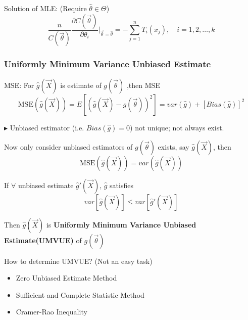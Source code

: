 \documentclass[11pt,a4paper]{ctexart}
\numberwithin{equation}{section}%
\newenvironment{point}{\raggedright$\blacktriangleright$}{}%
\begin{document}
        Solution of MLE: (Require $\hat{\theta}\in\Theta$)
        \[
            \frac{n}{C(\vec{\theta})}\frac{\partial C(\vec{\theta})}{\partial \theta_i}\bigg|_{\vec{\theta}=\hat{\theta}}=-\sum_{j=1}^nT_i(x_j),\quad i=1,2,\ldots,k    
        \]


\subsubsection{Uniformly Minimum Variance Unbiased Estimate}\label{SubSectionUMVUE}
        MSE: For $\hat{g}(\vec{X})$ is estimate of $g(\vec{\theta})$ ,then MSE
        \[
            \mathrm{MSE}(\hat{g}(\vec{X}))=E[(\hat{g}(\vec{X})-g(\vec{\theta}))^2]=var(\hat{g})+[Bias(\hat{g})]^2
        \]
\begin{point}
    Unbiased estimator (i.e. $Bias(\hat{g})=0$) not unique; not always exist.
\end{point}

    


        Now only consider unbiased estimators of $g(\vec{\theta})$ exists, say $\hat{g}(\vec{X})$, then
        \[ \mathrm{MSE}(\hat{g}(\vec{X}))=var(\hat{g}(\vec{X})) \]

        If $\forall$ unbiased estimate $\hat{g}\prime(\vec{X})$, $\hat{g}$ satisfies
        \[
            var[\hat{g}(\vec{X})]\leq var[\hat{g}\prime(\vec{X})]    
        \]

        Then $\hat{g}(\vec{X})$ is \textbf{Uniformly Minimum Variance Unbiased Estimate(UMVUE)} of $g(\vec{\theta})$

        How to determine UMVUE? (Not an easy task)
        \begin{itemize}
            \item Zero Unbiased Estimate Method
            \item Sufficient and Complete Statistic Method
            \item Cramer-Rao Inequality
        \end{itemize}
\end{document}
